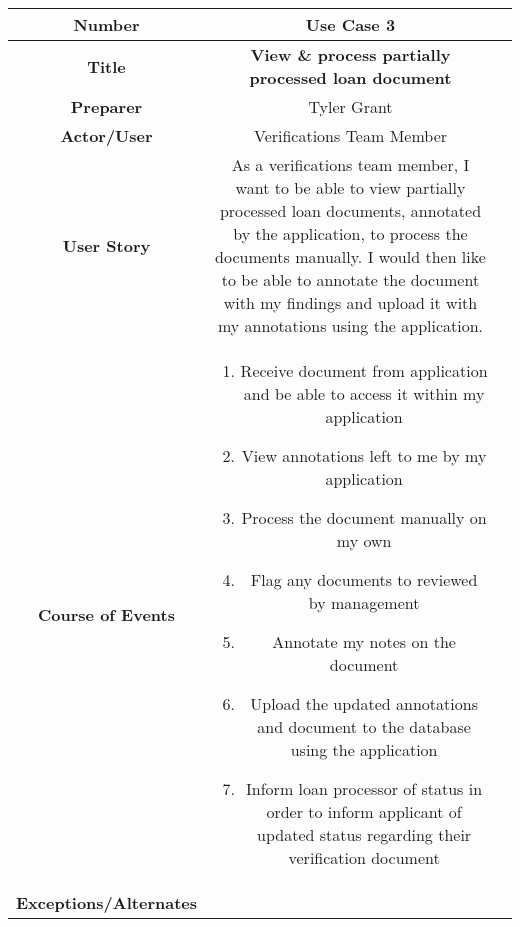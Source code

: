 \begin{table}[H]
    \centering
    \begin{tabularx}{0.75\linewidth}{||Sc|X||}
        \hline
        \hline
        \textbf{Number} & \textbf{Use Case 3} \\
        \hline
        \textbf{Title} & \textbf{View \& process partially processed loan document} \\
        \hline
        \textbf{Preparer} & Tyler Grant \\
        \hline
        \textbf{Actor/User} & Verifications Team Member \\
        \hline
        \textbf{User Story} &
        As a verifications team member, I want to be able to view partially processed loan documents, annotated by the application, to process the documents manually. I would then like to be able to annotate the document with my findings and upload it with my annotations using the application. \\
        \hline
        \textbf{Course of Events} &
        \begin{minipage}[l]{\linewidth}
            \begin{enumerate}[wide, labelindent=0pt]
                \item Receive document from application and be able to access it within my application
                \item View annotations left to me by my application
                \item Process the document manually on my own
                \item Flag any documents to reviewed by management
                \item Annotate my notes on the document
                \item Upload the updated annotations and document to the database using the application
                \item Inform loan processor of status in order to inform applicant of updated status regarding their verification document
            \end{enumerate}
            \vspace{4pt}
        \end{minipage} \\
        \hline
        \textbf{Exceptions/Alternates} & 
        \begin{minipage}[l]{\linewidth}
            \vspace{2pt}
            \begin{itemize}[wide, labelindent=0pt]

\end{itemize}
\end{minipage}
\end{tabularx}
\end{table}

